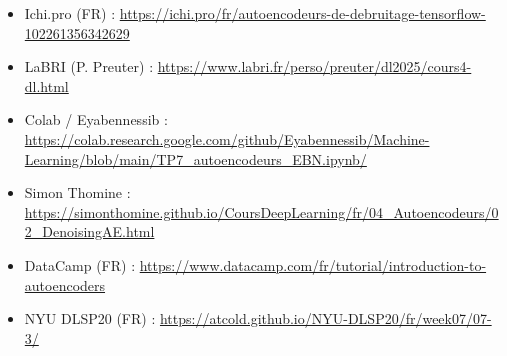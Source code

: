 \documentclass[11pt,a4paper]{article}
\begin{document}
\begin{itemize}
  \item Ichi.pro (FR) : \url{https://ichi.pro/fr/autoencodeurs-de-debruitage-tensorflow-102261356342629}
  \item LaBRI (P. Preuter) : \url{https://www.labri.fr/perso/preuter/dl2025/cours4-dl.html}
  \item Colab / Eyabennessib : \url{https://colab.research.google.com/github/Eyabennessib/Machine-Learning/blob/main/TP7_autoencodeurs_EBN.ipynb/}
  \item Simon Thomine : \url{https://simonthomine.github.io/CoursDeepLearning/fr/04_Autoencodeurs/02_DenoisingAE.html}
  \item DataCamp (FR) : \url{https://www.datacamp.com/fr/tutorial/introduction-to-autoencoders}
  \item NYU DLSP20 (FR) : \url{https://atcold.github.io/NYU-DLSP20/fr/week07/07-3/}
\end{itemize}
\end{document}
